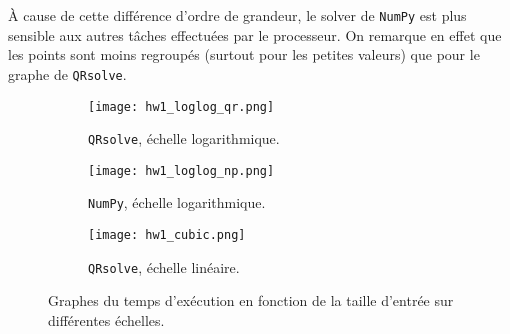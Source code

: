 \documentclass[11pt]{article}
\begin{document}
À cause de cette différence d'ordre de grandeur, le solver de \texttt{NumPy} est plus sensible aux autres tâches effectuées par le processeur.
On remarque en effet que les points sont moins regroupés (surtout pour les petites valeurs) que pour le graphe de \texttt{QRsolve}.

\begin{figure}[H]
	\centering
	\begin{subfigure}{0.33\textwidth}
		\centering
		\texttt{[image: hw1\_loglog\_qr.png]}
		\caption{\texttt{QRsolve}, échelle logarithmique.}
		\label{fig:llqr}
	\end{subfigure}%
	\begin{subfigure}{0.33\textwidth}
		\centering
		\texttt{[image: hw1\_loglog\_np.png]}
		\caption{\texttt{NumPy}, échelle logarithmique.}
		\label{fig:llnp}
	\end{subfigure}
	\begin{subfigure}{0.33\textwidth}
		\centering
		\texttt{[image: hw1\_cubic.png]}
		\caption{\texttt{QRsolve}, échelle linéaire.}
		\label{fig:cubic}
	\end{subfigure}
	\caption{Graphes du temps d'exécution en fonction de la taille d'entrée sur différentes échelles.}
	\label{fig:manmade}
\end{figure}
\end{document}
